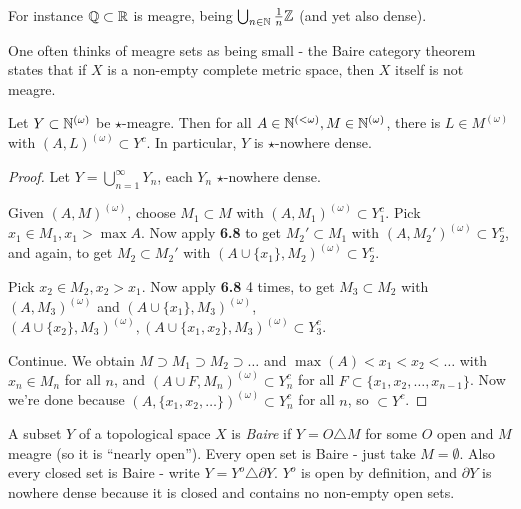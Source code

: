 \documentclass[10pt,a4paper]{article}
\begin{document}
For instance $\mathbb{Q} \subset \mathbb{R}$ is meagre, being $\bigcup_{n \in \mathbb{N}}\frac{1}{n}\mathbb{Z}$ (and yet also dense).

One often thinks of meagre sets as being small - the Baire category theorem states that if $X$ is a non-empty complete metric space, then $X$ itself is not meagre.
\begin{theorem}
  Let $Y \subset \mathbb{N}^{(\omega)}$ be $\star$-meagre. Then for all $A \in \mathbb{N}^{(<\omega)}, M\in \mathbb{N}^{(\omega)}$, there is $L \in M^{(\omega)}$ with $(A,L)^{(\omega)} \subset Y^c$. In particular, $Y$ is $\star$-nowhere dense.
\end{theorem}
\begin{proof}
  Let $Y = \bigcup_{n=1}^\infty Y_n$, each $Y_n$ $\star$-nowhere dense.

  Given $(A,M)^{(\omega)}$, choose $M_1 \subset M$ with $(A, M_1)^{(\omega)}\subset Y_1^c$. Pick $x_1 \in M_1, x_1> \max A$. Now apply \textbf{6.8} to get $M_2'\subset M_1$ with $(A,M_2')^{(\omega)}\subset Y_2^c$, and again, to get $M_2 \subset M_2'$ with $(A\cup \{x_1\}, M_2)^{(\omega)} \subset Y_2^c$.

  Pick $x_2 \in M_2, x_2 > x_1$. Now apply \textbf{6.8} 4 times, to get $M_3 \subset M_2$ with $(A,M_3)^{(\omega)}$ and $(A\cup \{x_1\}, M_3)^{(\omega)}$, $(A\cup\{x_2\}, M_3)^{(\omega)}, (A\cup\{x_1,x_2\}, M_3)^{(\omega)} \subset Y_3^c$.

  Continue. We obtain $M \supset M_1 \supset M_2 \supset \ldots$ and $\max(A) < x_1 < x_2 < \ldots$ with $x_n \in M_n$ for all $n$, and $(A\cup F, M_n)^{(\omega)} \subset Y_n^c$ for all $F \subset \{x_1, x_2, \ldots, x_{n-1}\}$. Now we're done because $(A, \{x_1, x_2, \ldots\})^{(\omega)} \subset Y_n^c$ for all $n$, so $\subset Y^c$.
\end{proof}
A subset $Y$ of a topological space $X$ is \emph{Baire} if $Y = O \triangle M$ for some $O$ open and $M$ meagre (so it is ``nearly open''). Every open set is Baire - just take $M = \emptyset$. Also every closed set is Baire - write $Y = Y^o \triangle \partial Y$. $Y^o$ is open by definition, and $\partial Y$ is nowhere dense because it is closed and contains no non-empty open sets.
\end{document}
